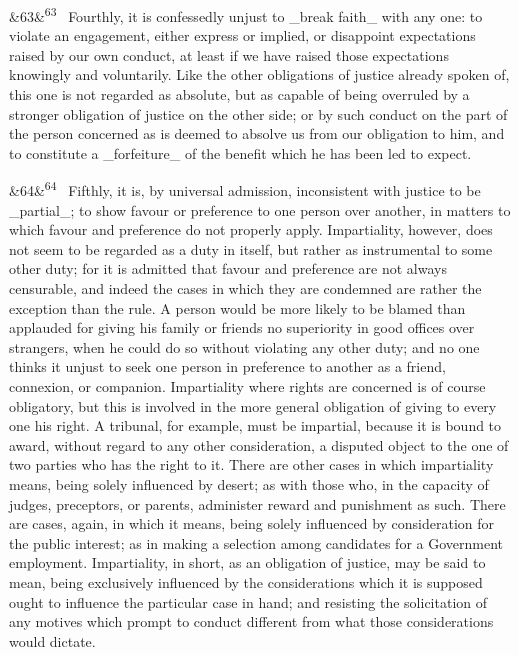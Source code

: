 \documentclass[12pt]{article}
\newcommand{\para}[1][]{\par\noindent\ifx&#1&\else\textsuperscript{\footnotesize #1}~\fi}
\begin{document}
\para[63] Fourthly, it is confessedly unjust to \_break faith\_ with any one: to violate an engagement, either express or implied, or disappoint expectations raised by our own conduct, at least if we have raised those expectations knowingly and voluntarily. Like the other obligations of justice already spoken of, this one is not regarded as absolute, but as capable of being overruled by a stronger obligation of justice on the other side; or by such conduct on the part of the person concerned as is deemed to absolve us from our obligation to him, and to constitute a \_forfeiture\_ of the benefit which he has been led to expect.

\para[64] Fifthly, it is, by universal admission, inconsistent with justice to be \_partial\_; to show favour or preference to one person over another, in matters to which favour and preference do not properly apply. Impartiality, however, does not seem to be regarded as a duty in itself, but rather as instrumental to some other duty; for it is admitted that favour and preference are not always censurable, and indeed the cases in which they are condemned are rather the exception than the rule. A person would be more likely to be blamed than applauded for giving his family or friends no superiority in good offices over strangers, when he could do so without violating any other duty; and no one thinks it unjust to seek one person in preference to another as a friend, connexion, or companion. Impartiality where rights are concerned is of course obligatory, but this is involved in the more general obligation of giving to every one his right. A tribunal, for example, must be impartial, because it is bound to award, without regard to any other consideration, a disputed object to the one of two parties who has the right to it. There are other cases in which impartiality means, being solely influenced by desert; as with those who, in the capacity of judges, preceptors, or parents, administer reward and punishment as such. There are cases, again, in which it means, being solely influenced by consideration for the public interest; as in making a selection among candidates for a Government employment. Impartiality, in short, as an obligation of justice, may be said to mean, being exclusively influenced by the considerations which it is supposed ought to influence the particular case in hand; and resisting the solicitation of any motives which prompt to conduct different from what those considerations would dictate.
\end{document}
